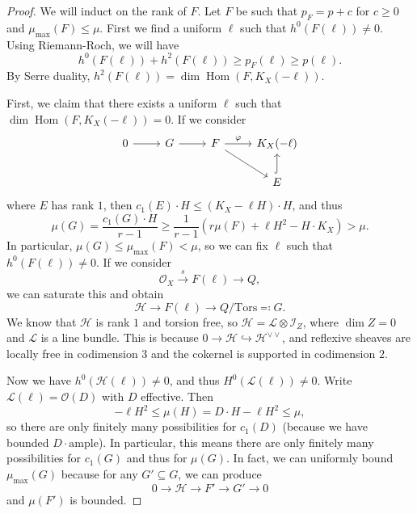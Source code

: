 \documentclass[leqno, openany]{memoir}
\theoremstyle{definition}
\theoremstyle{remark}
\theoremstyle{plain}
\theoremstyle{definition}
\theoremstyle{remark}
\newcommand{\mc}[1]{\mathcal{#1}}
\newcommand{\mr}[1]{\mathrm{#1}}
\DeclareMathOperator{\Hom}{Hom}
\begin{document}
\begin{proof}
    We will induct on the rank of $F$. Let $F$ be such that $p_F = p + c$ for $c \geq 0$ and $\mu_{\mr{max}}(F) \leq \mu$. First we find a uniform $\ell$ such that $h^0(F(\ell)) \neq 0$. Using Riemann-Roch, we will have
    \[ h^0(F(\ell)) + h^2(F(\ell)) \geq p_F(\ell) \geq p(\ell). \]
    By Serre duality, $h^2(F(\ell)) = \dim \Hom(F, K_X(-\ell))$.

    First, we claim that there exists a uniform $\ell$ such that $\dim \Hom(F, K_X(-\ell)) = 0$. If we consider
    \begin{equation*}
    \begin{tikzcd}
        0 \ar{r} & G \ar{r} & F \ar{r}{\varphi} \ar{dr} & K_X(-\ell) \\
        & & & E \ar[hookrightarrow]{u}
    \end{tikzcd}
    \end{equation*}
    where $E$ has rank $1$, then $c_1(E) \cdot H \leq (K_X - \ell H) \cdot H$, and thus
    \[ \mu(G) = \frac{c_1(G) \cdot H}{r-1} \geq \frac{1}{r-1} (r \mu(F) + \ell H^2 - H \cdot K_X) > \mu. \]
    In particular, $\mu(G) \leq \mu_{\mr{max}}(F) < \mu$, so we can fix $\ell$ such that $h^0(F(\ell)) \neq 0$. If we consider
    \[ \mc{O}_X \xrightarrow{s} F(\ell) \to Q, \]
    we can saturate this and obtain
    \[ \mc{H} \to F(\ell) \to Q/\mr{Tors} \eqqcolon G. \]
    We know that $\mc{H}$ is rank $1$ and torsion free, so $\mc{H} = \mc{L} \otimes \mc{I}_Z$, where $\dim Z = 0$ and $\mc{L}$ is a line bundle. This is because $0 \to \mc{H} \hookrightarrow \mc{H}^{\vee \vee}$, and reflexive sheaves are locally free in codimension $3$ and the cokernel is supported in codimension $2$.

    Now we have $h^0(\mc{H}(\ell)) \neq 0$, and thus $H^0(\mc{L}(\ell)) \neq 0$. Write $\mc{L}(\ell) = \mc{O}(D)$ with $D$ effective. Then 
    \[ -\ell H^2 \leq \mu(H) = D \cdot H - \ell H^2 \leq \mu, \]
    so there are only finitely many possibilities for $c_1(D)$ (because we have bounded $D \cdot \text{ample}$). In particular, this means there are only finitely many possibilities for $c_1(G)$ and thus for $\mu(G)$. In fact, we can uniformly bound $\mu_{\mr{max}}(G)$ because for any $G' \subseteq G$, we can produce
    \[ 0 \to \mc{H} \to F' \to G' \to 0 \]
    and $\mu(F')$ is bounded.


\end{proof}
\end{document}
